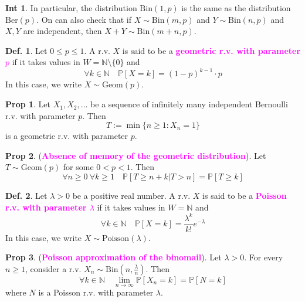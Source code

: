 \documentclass[8pt,a4paper,landscape]{article}
\theoremstyle{definition}
\newtheorem{definition}{Def.}[section]
\theoremstyle{example}
\theoremstyle{intuition}
\newtheorem*{intuition}{Int}
\theoremstyle{definition}
\newtheorem{proposition}{Prop}[section]
\newcommand{\mydef}[1]{\textcolor{magenta}{\textbf{#1}}}
\newcommand{\prob}[1]{\mathbb{P}\left[ #1 \right]}
\begin{document}
\begin{multicols}{3}
			\begin{intuition}
				In particular, the distribution $\text{Bin}(1,p)$ is the same as the distribution $\text{Ber}(p)$. On can also check that if $X \sim \text{Bin}(m,p)$ and $Y \sim \text{Bin}(n,p)$ and $X,Y$ are independent, then $X + Y \sim \text{Bin}(m + n, p)$.
			\end{intuition}

			\begin{definition}
				Let $0 \leq p \leq 1$. A r.v. $X$ is said to be a \mydef{geometric r.v. with parameter $p$} if it takes values in $W = \mathbb{N} \setminus \{0\}$ and 
				$$
					\forall k \in \mathbb{N} \quad \prob{X = k} = (1-p)^{k-1} \cdot p
				$$
				In this case, we write $X \sim \text{Geom}(p)$.
			\end{definition}

			\begin{proposition}
				Let $X_1, X_2, \ldots$ be a sequence of infinitely many independent Bernoulli r.v. with parameter $p$. Then
				$$
				T := \min\{n \geq 1 : X_n = 1\}
				$$
				is a geometric r.v. with parameter $p$.
			\end{proposition}

			\begin{proposition}
				(\mydef{Absence of memory of the geometric distribution}). Let $T \sim \text{Geom}(p)$ for some $0 < p < 1$. Then
				$$
					\forall n \geq 0 \ \forall k \geq 1 \quad \prob{T \geq n + k \lvert T > n} = \prob{T \geq k}
				$$
			\end{proposition}

			\begin{definition}
				Let $\lambda > 0$ be a positive real number. A r.v. $X$ is said to be a \mydef{Poisson r.v. with parameter $\lambda$} if it takes values in $W = \mathbb{N}$ and 
				$$
				\forall k \in \mathbb{N} \quad \prob{X = k} = \frac{\lambda^k}{k!} e^{-\lambda}
				$$
				In this case, we write $X \sim \text{Poisson}(\lambda)$.
			\end{definition}

			\begin{proposition}
				(\mydef{Poisson approximation of the binomail}). Let $\lambda > 0$. For every $n \geq 1$, consider a r.v. $X_n \sim \text{Bin}(n, \frac{\lambda}{n})$. Then
				$$
					\forall k \in \mathbb{N} \quad \lim\limits_{n \to \infty} \prob{X_n = k} = \prob{N = k}
				$$
				where $N$ is a Poisson r.v. with parameter $\lambda$.
			\end{proposition}



\end{multicols}
\end{document}
